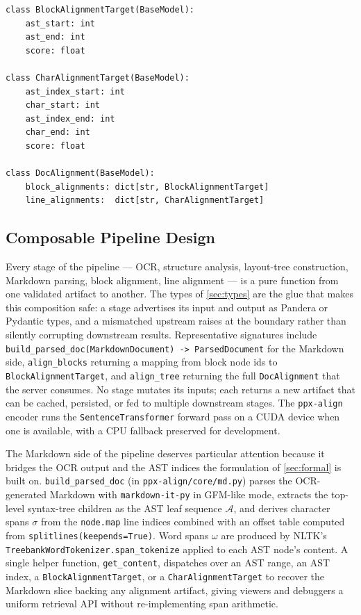 \documentclass{article}
\theoremstyle{definition}
\begin{document}
\begin{lstlisting}[caption={Pydantic models for alignment targets
      (\texttt{ppx-align/core/types.py}).},
    label={lst:align-types}]
class BlockAlignmentTarget(BaseModel):
    ast_start: int
    ast_end: int
    score: float

class CharAlignmentTarget(BaseModel):
    ast_index_start: int
    char_start: int
    ast_index_end: int
    char_end: int
    score: float

class DocAlignment(BaseModel):
    block_alignments: dict[str, BlockAlignmentTarget]
    line_alignments:  dict[str, CharAlignmentTarget]
\end{lstlisting}

\subsection{Composable Pipeline Design}
\label{sec:compose-sys}

Every stage of the pipeline --- OCR, structure analysis,
layout-tree construction, Markdown parsing, block alignment, line
alignment --- is a pure function from one validated artifact to
another.  The types of \cref{sec:types} are the glue that makes
this composition safe: a stage advertises its input and output as
Pandera or Pydantic types, and a mismatched upstream raises at the
boundary rather than silently corrupting downstream results.
Representative signatures include
\texttt{build\_parsed\_doc(MarkdownDocument) -> ParsedDocument} for
the Markdown side, \texttt{align\_blocks} returning a mapping from
block node ids to \texttt{BlockAlignmentTarget}, and
\texttt{align\_tree} returning the full \texttt{DocAlignment} that
the server consumes.  No stage mutates its inputs; each returns a
new artifact that can be cached, persisted, or fed to multiple
downstream stages.  The \texttt{ppx-align} encoder runs the
\texttt{SentenceTransformer} forward pass on a CUDA device when one
is available, with a CPU fallback preserved for development.

The Markdown side of the pipeline deserves particular attention
because it bridges the OCR output and the AST indices the
formulation of \cref{sec:formal} is built on.
\texttt{build\_parsed\_doc} (in \texttt{ppx-align/core/md.py})
parses the OCR-generated Markdown with \texttt{markdown-it-py} in
GFM-like mode, extracts the top-level syntax-tree children as the
AST leaf sequence $\mathcal{A}$, and derives character spans
$\sigma$ from the \texttt{node.map} line indices combined with an
offset table computed from \texttt{splitlines(keepends=True)}.  Word
spans $\omega$ are produced by NLTK's
\texttt{TreebankWordTokenizer.span\_tokenize} applied to each AST
node's content.  A single helper function,
\texttt{get\_content}, dispatches over an AST range, an AST index,
a \texttt{BlockAlignmentTarget}, or a \texttt{CharAlignmentTarget}
to recover the Markdown slice backing any alignment artifact,
giving viewers and debuggers a uniform retrieval API without
re-implementing span arithmetic.
\end{document}
